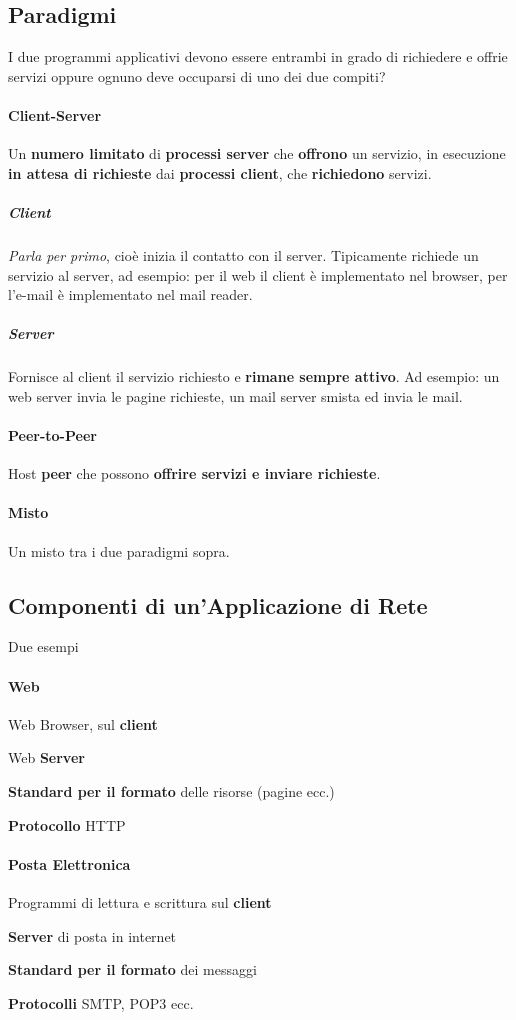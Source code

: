 \documentclass[10pt]{article}
\begin{document}
\subsection{Paradigmi}
I due programmi applicativi devono essere entrambi in grado di richiedere e offrie servizi oppure ognuno deve occuparsi di uno dei due compiti?
\paragraph{Client-Server} Un \textbf{numero limitato} di \textbf{processi server} che \textbf{offrono} un servizio, in esecuzione \textbf{in attesa di richieste} dai \textbf{processi client}, che \textbf{richiedono} servizi.
\subparagraph{Client} \textit{Parla per primo}, cioè inizia il contatto con il server. Tipicamente richiede un servizio al server, ad esempio: per il web il client è implementato nel browser, per l'e-mail è implementato nel mail reader.
\subparagraph{Server} Fornisce al client il servizio richiesto e \textbf{rimane sempre attivo}. Ad esempio: un web server invia le pagine richieste, un mail server smista ed invia le mail.
\paragraph{Peer-to-Peer} Host \textbf{peer} che possono \textbf{offrire servizi e inviare richieste}.
\paragraph{Misto} Un misto tra i due paradigmi sopra.
\subsection{Componenti di un'Applicazione di Rete}
Due esempi
\paragraph{Web}
\begin{list}{-}{Composto da:}
\item Web Browser, sul \textbf{client}
\item Web \textbf{Server}
\item \textbf{Standard per il formato} delle risorse (pagine ecc.)
\item \textbf{Protocollo} HTTP
\end{list}
\paragraph{Posta Elettronica}
\begin{list}{-}{Composta da:}
\item Programmi di lettura e scrittura sul \textbf{client}
\item \textbf{Server} di posta in internet
\item \textbf{Standard per il formato} dei messaggi
\item \textbf{Protocolli} SMTP, POP3 ecc.
\end{list}
\end{document}
